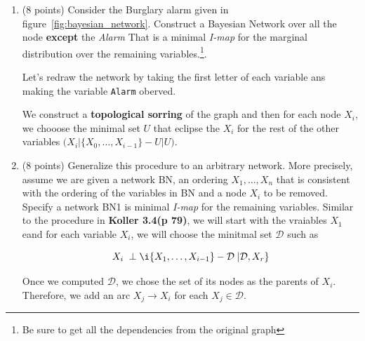 \documentclass[10pt]{article}
\begin{document}
\begin{enumerate}
  \item (8 points) Consider the Burglary alarm given in
    figure~\ref{fig:bayesian_network}. Construct a Bayesian Network  over all
    the node \textbf{except} the \emph{Alarm} That is a minimal \emph{I-map} for
    the marginal distribution over the remaining variables.\footnote{Be sure to
    get all the dependencies from the original graph}.

    Let's redraw the network by taking the first letter of each variable ans
    making the variable \texttt{Alarm} oberved.

\begin{center}
\end{center}


We construct a \textbf{topological sorring} of the graph and then for each node
$X_i$, we chooose the minimal set $U$ that eclipse the $X_i$ for the rest of the
other variables $\big(X_i | \{X_0,\ldots, X_{i-1}\} - U | U\big)$.

\begin{center}
  

\end{center}

  \item (8 points) Generalize this procedure to an arbitrary network. More
    precisely, assume we are given a network BN, an ordering $X_1,\ldots,X_n$
    that is consistent with the ordering of the variables in BN and a node $X_i$
    to be removed. Specify a network BN1 is minimal \emph{I-map} for the
    remaining variables.
    Similar to the procedure in \textbf{Koller 3.4(p 79)}, we will start with
    the vraiables $X_1$ eand for each variable $X_i$, we will choose the
    minitmal set $\mathcal{D}$ such as

    \begin{equation}
    X_i\;\perp\i\{X_1,\ldots,X_{i-1}\}-\mathcal{D}\;| \mathcal{D},X_r\}
    \end{equation}

    Once we computed $\mathcal{D}$, we chose the set of its nodes as the parents
    of $X_i$. Therefore, we add an arc $X_j\rightarrow X_i$ for each
    $X_j\in\mathcal{D}$.
\end{enumerate}
\end{document}
